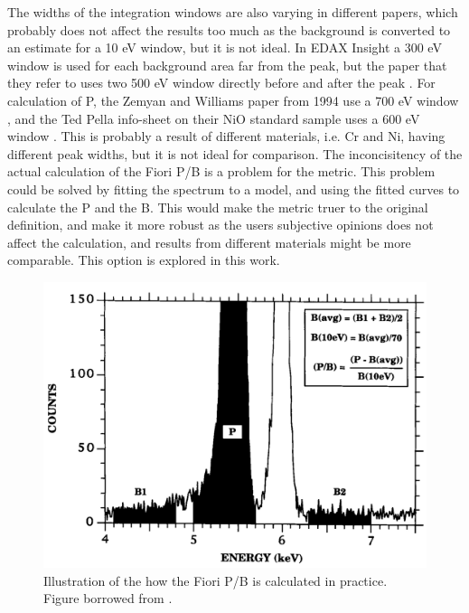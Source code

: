 The widths of the integration windows are also varying in different papers, which probably does not affect the results too much as the background is converted to an estimate for a 10 eV window, but it is not ideal.
In EDAX Insight a 300 eV window is used for each background area far from the peak, but the paper that they refer to uses two 500 eV window directly before and after the peak \cite{egerton_characterization_1994}.
For calculation of P, the Zemyan and Williams paper from 1994 use a 700 eV window \cite{zemyan_standard_performance_1994}, and the Ted Pella info-sheet on their NiO standard sample uses a 600 eV window \cite{ted_pella_nio_tem_2019}.
This is probably a result of different materials, i.e. Cr and Ni, having different peak widths, but it is not ideal for comparison.
The inconcisitency of the actual calculation of the Fiori P/B is a problem for the metric.
This problem could be solved by fitting the spectrum to a model, and using the fitted curves to calculate the P and the B.
This would make the metric truer to the original definition, and make it more robust as the users subjective opinions does not affect the calculation, and results from different materials might be more comparable.
This option is explored in this work. 




\begin{figure}
    \centering
    \includegraphics[width=0.6\linewidth]{figures/FioriPB_reality_TODO_remake.png}
    \caption{Illustration of the how the Fiori P/B is calculated in practice.
        Figure borrowed from \cite{zemyan_standard_performance_1994}.}
    \label{fig:fiori_pb_reality}
\end{figure}


